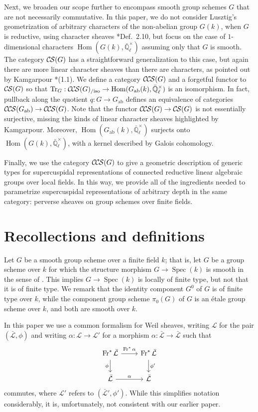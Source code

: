 \documentclass[10pt]{amsart}
\theoremstyle{plain}
\theoremstyle{definition}
\newcommand{\EE}{\mathbb{\bar Q}_\ell}
\newcommand{\Fq}{k}
\newcommand{\EEx}{\EE^\times}
\newcommand{\Frob}[1]{\operatorname{Fr}_{#1}}
\DeclareMathOperator{\Hom}{Hom}
\newcommand{\Spec}[1]{{\operatorname{Spec}(#1)}}
\newcommand{\ab}{_{\operatorname{ab}}}
\newcommand{\TrFrob}[1]{\operatorname{Tr}_{#1}}
\newcommand{\cs}[1]{{\mathcal{#1}}}
\newcommand{\gcs}[1]{{\mathcal{\bar #1}}}
\newcommand{\CS}{{\mathcal{C\hskip-0.8pt S}}}
\newcommand{\CCS}{{\mathcal{C\hskip-.8pt C\hskip-0.8pt S}}}
\newcommand{\CCSiso}[1]{\CCS(#1)_{/\text{iso}}}
\begin{document}
Next, we broaden our scope further to encompass smooth group schemes $G$ that are not necessarily commutative.
In this paper, we do not consider Lusztig's geometrization of arbitrary characters of the non-abelian group $G(k)$, when $G$ is reductive,
using character sheaves \cite{lusztig:85a}*{Def.~2.10}, but focus on the case of $1$-dimensional characters
$\Hom(G(k), \EEx)$ assuming only that $G$ is smooth. The category $\CS(G)$ has a straightforward generalization to this case, but again
there are more linear character sheaves than there are characters, as pointed out by Kamgarpour \cite{kamgarpour:09a}*{(1.1)}.
We define a category $\CCS(G)$ and a forgetful functor to $\CS(G)$ so that $\TrFrob{G} : \CCSiso{G} \to \Hom(G\ab(k), \EEx)$
is an isomorphism.  In fact, pullback along the quotient $q : G \to G\ab$ defines an equivalence of categories
$\CCS(G\ab) \to \CCS(G)$.  Note that the functor $\CCS(G) \to \CS(G)$ is not essentially surjective, missing
the kinds of linear character sheaves highlighted by Kamgarpour.  Moreover, $\Hom(G\ab(k), \EEx)$ surjects
onto $\Hom(G(k), \EEx)$, with a kernel described by Galois cohomology.

Finally, we use the category $\CCS(G)$ to give a geometric description of generic types for supercuspidal representations
of connected reductive linear algebraic groups over local fields.  In this way, we provide all of the ingredients
needed to parametrize supercuspidal representations of arbitrary depth in the same category:
perverse sheaves on group schemes over finite fields.


\section{Recollections and definitions} \label{sec:defs}

Let $G$ be a smooth group scheme over a finite field $\Fq$; that is, let $G$ be a group scheme over $\Fq$
for which the structure morphism $G \to \Spec{\Fq}$ is smooth in the sense of .
This implies $G \to \Spec{\Fq}$ is locally of finite type, but not that it is of finite type.
We remark that the identity component $G^0$ of $G$ is of finite type over $\Fq$, while the component group scheme
$\pi_0(G)$ of $G$ is an \'etale group scheme over $\Fq$, and both are smooth over $\Fq$.

In this paper we use a common formalism for Weil sheaves, writing $\cs{L}$ for the pair $(\gcs{L},\phi)$ and writing $\alpha : \cs{L} \to \cs{L}'$ for a morphism $\alpha : \gcs{L} \to \gcs{L}$ such that 
\[
\begin{tikzcd}
\Frob{}^* \gcs{L} \arrow{d}[swap]{\phi} \arrow{r}{\Frob{}^*\alpha} &  \Frob{}^* \gcs{L} \arrow{d}{\phi'}\\
\gcs{L} \arrow{r}{\alpha} & \gcs{L}
\end{tikzcd}
\]
commutes, where $\cs{L}'$ refers to $(\gcs{L}',\phi')$.
While this simplifies notation considerably, it is, unfortunately, not consistent with our earlier paper.
\end{document}
